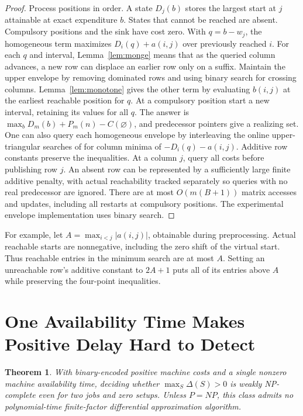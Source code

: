 \documentclass[11pt,letterpaper]{article}
\newtheorem{theorem}{Theorem}
\begin{document}
\begin{proof}
Process positions in order. A state $D_j(b)$ stores the largest start at $j$ attainable at exact expenditure $b$. States that cannot be reached are absent. Compulsory positions and the sink have cost zero. With $q=b-w_j$, the homogeneous term maximizes $D_i(q)+a(i,j)$ over previously reached $i$. For each $q$ and interval, Lemma~\ref{lem:monge} means that as the queried column advances, a new row can displace an earlier row only on a suffix. Maintain the upper envelope by removing dominated rows and using binary search for crossing columns. Lemma~\ref{lem:monotone} gives the other term by evaluating $b(i,j)$ at the earliest reachable position for $q$. At a compulsory position start a new interval, retaining its values for all $q$. The answer is $\max_b D_m(b)+P_m(n)-C(\varnothing)$, and predecessor pointers give a realizing set. One can also query each homogeneous envelope by interleaving the online upper-triangular searches of \citet[][pp.~310--311]{Galil1990} for column minima of $-D_i(q)-a(i,j)$. Additive row constants preserve the inequalities. At a column $j$, query all costs before publishing row $j$. An absent row can be represented by a sufficiently large finite additive penalty, with actual reachability tracked separately so queries with no real predecessor are ignored. There are at most $O(m(B+1))$ matrix accesses and updates, including all restarts at compulsory positions. The experimental envelope implementation uses binary search.
\end{proof}

For example, let $A=\max_{i<j}|a(i,j)|$, obtainable during preprocessing. Actual reachable starts are nonnegative, including the zero shift of the virtual start. Thus reachable entries in the minimum search are at most $A$. Setting an unreachable row's additive constant to $2A+1$ puts all of its entries above $A$ while preserving the four-point inequalities.

\section{One Availability Time Makes Positive Delay Hard to Detect}
\label{sec:hardness}

\begin{theorem}
\label{thm:hardness}
With binary-encoded positive machine costs and a single nonzero machine availability time, deciding whether $\max_S\Delta(S)>0$ is weakly NP-complete even for two jobs and zero setups. Unless $P=NP$, this class admits no polynomial-time finite-factor differential approximation algorithm.
\end{theorem}
\end{document}
